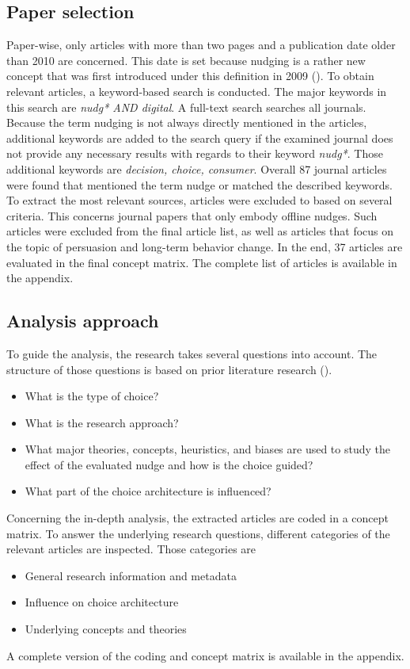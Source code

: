 \subsection{Paper selection}
Paper-wise, only articles with more than two pages and a publication date older than 2010 are concerned. This date is set because nudging is a rather new concept that was first introduced under this definition in 2009 (\cite{thaler_nudge:_2009}). To obtain relevant articles, a keyword-based search is conducted. The major keywords in this search are \textit{nudg* AND digital}. A full-text search searches all journals. Because the term nudging is not always directly mentioned in the articles, additional keywords are added to the search query if the examined journal does not provide any necessary results with regards to their keyword \textit{nudg*}. Those additional keywords are \textit{decision, choice, consumer}. Overall 87 journal articles were found that mentioned the term nudge or matched the described keywords. To extract the most relevant sources, articles were excluded to based on several criteria. This concerns journal papers that only embody offline nudges. Such articles were excluded from the final article list, as well as articles that focus on the topic of persuasion and long-term behavior change. In the end, 37 articles are evaluated in the final concept matrix. The complete list of articles is available in the appendix. %

\subsection{Analysis approach}
To guide the analysis, the research takes several questions into account. The structure of those questions is based on prior literature research (\cite{alavi_review_1992}).
\begin{itemize}
\item What is the type of choice?
\item What is the research approach?
\item What major theories, concepts, heuristics, and biases are used to study the effect of the evaluated nudge and how is the choice guided?
\item What part of the choice architecture is influenced?
\end{itemize}

Concerning the in-depth analysis, the extracted articles are coded in a concept matrix. To answer the underlying research questions, different categories of the relevant articles are inspected. Those categories are 
\begin{itemize}
\item General research information and metadata
\item Influence on choice architecture
\item Underlying concepts and theories
\end{itemize}

A complete version of the coding and concept matrix is available in the appendix. %